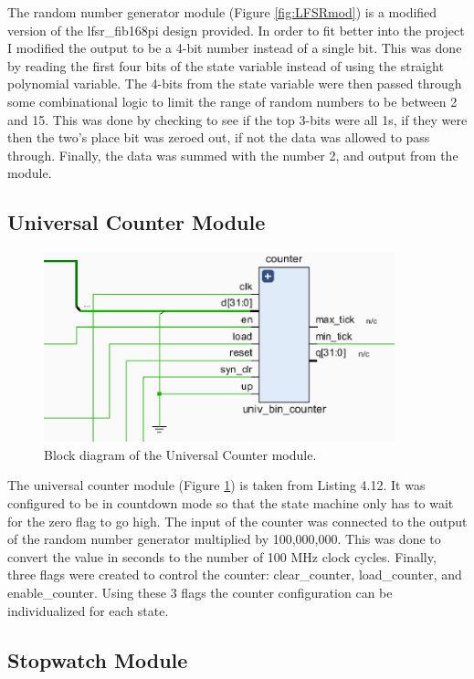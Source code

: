 \documentclass[11pt]{article}
\begin{document}
The random number generator module (Figure \ref{fig:LFSRmod}) is a modified version of the lfsr\_fib168pi design provided. In order to fit better into the project I modified the output to be a 4-bit number instead of a single bit. This was done by reading the first four bits of the state variable instead of using the straight polynomial variable. The 4-bits from the state variable were then passed through some combinational logic to limit the range of random numbers to be between 2 and 15. This was done by checking to see if the top 3-bits were all 1s, if they were then the two's place bit was zeroed out, if not the data was allowed to pass through. Finally, the data was summed with the number 2, and output from the module.

\subsection{Universal Counter Module}

\begin{figure}[H]
\includegraphics [width=4in]{counter.eps}
	\centering
	\caption{Block diagram of the Universal Counter module.}
	\label{fig:counterMod}
\end{figure}

The universal counter module (Figure \ref{fig:counterMod}) is taken from Listing 4.12. It was configured to be in countdown mode so that the state machine only has to wait for the zero flag to go high. The input of the counter was connected to the output of the random number generator multiplied by 100,000,000. This was done to convert the value in seconds to the number of 100 MHz clock cycles. Finally, three flags were created to control the counter: clear\_counter, load\_counter, and enable\_counter. Using these 3 flags the counter configuration can be individualized for each state.

\subsection{Stopwatch Module}
\end{document}
